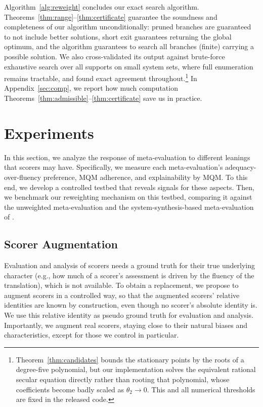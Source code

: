 \documentclass[11pt]{article}
\begin{document}
Algorithm~\ref{alg:reweight} concludes our exact search algorithm.
Theorems~\ref{thm:range}--\ref{thm:certificate} guarantee the soundness and completeness of our algorithm unconditionally: pruned branches are guaranteed to not include better solutions, short exit guarantees returning the global optimum, and the algorithm guarantees to search all branches (finite) carrying a possible solution. We also cross-validated its output against brute-force exhaustive search over all supports on small system sets, where full enumeration remains tractable, and found exact agreement throughout.\footnote{Theorem~\ref{thm:candidates} bounds the stationary points by the roots of a degree-five polynomial, but our implementation solves the equivalent rational secular equation directly rather than rooting that polynomial, whose coefficients become badly scaled as $\theta_2 \to 0$. This and all numerical thresholds are fixed in the released code.}
In Appendix~\ref{sec:comp}, we report how much computation Theorems~\ref{thm:admissible}--\ref{thm:certificate} save us in practice.


\section{Experiments}\label{sec:experiments}

In this section, we analyze the response of meta-evaluation to different
leanings that scorers may have. Specifically, we measure
each meta-evaluation's adequacy-over-fluency preference, MQM adherence, and explainability by MQM. To this end, we develop a controlled testbed that reveals signals for these aspects. Then, we benchmark our reweighting
mechanism on this testbed, comparing it against the unweighted
meta-evaluation and the system-synthesis-based meta-evaluation of
\citet{shayegh-etal-2025-feeding}.

\subsection{Scorer Augmentation}

Evaluation and analysis of scorers needs a ground truth for their true
underlying character (e.g., how much of a scorer's assessment is driven by
the fluency of the translation), which is not available. To obtain a replacement, we propose to augment scorers in a
controlled way, so that the augmented scorers' relative identities are known by construction, even though no scorer's absolute
identity is. We use this relative identity as pseudo ground truth for evaluation
and analysis. Importantly, we augment real scorers, staying close to their natural
biases and characteristics, except for those we control in particular.
\end{document}
